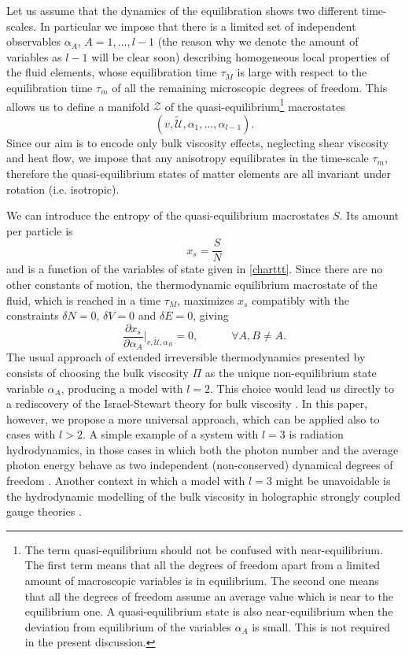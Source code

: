 \documentclass[useAMS,usenatbib,prd,twocolumn,nofootinbib]{revtex4-1}
\newcommand{\spc}{\quad \quad \quad}
\begin{document}
Let us assume  that the dynamics of the equilibration shows two different time-scales. In particular we impose that there is a limited set of independent observables $\alpha_A$, $A=1,...,l-1$ (the reason why we denote the amount of variables as $l-1$ will be clear soon) describing homogeneous local properties of the fluid elements, whose equilibration time $\tau_M$ is large with respect to the equilibration time $\tau_m$ of all the remaining microscopic degrees of freedom. This allows us to define a manifold $\mathcal{Z}$ of the quasi-equilibrium\footnote{
    The term quasi-equilibrium should not be confused with near-equilibrium. The first term means that all the degrees of freedom apart from a limited amount of macroscopic variables is in equilibrium. The second one means that all the degrees of freedom assume an average value which is near to the equilibrium one. A quasi-equilibrium state is also near-equilibrium when the deviation from equilibrium of the variables $\alpha_A$ is small. This is not required in the present discussion.
    } macrostates 
\begin{equation}\label{charttt}
(v, \tilde{\mathcal{U}} ,\alpha_1,...,\alpha_{l-1}).
\end{equation}  
Since our aim is to encode only bulk viscosity effects, neglecting shear viscosity and heat flow, we impose that any anisotropy equilibrates in the time-scale $\tau_m$, therefore the quasi-equilibrium states of matter elements are all invariant under rotation (i.e. isotropic).


We can introduce the entropy of the quasi-equilibrium macrostates $S$. Its amount per particle is 
\begin{equation}
x_s = \dfrac{S}{N}
\end{equation}
and is a function of the variables of state given in \eqref{charttt}. Since there are no other constants of motion, the thermodynamic equilibrium macrostate of the fluid, which is reached in a time $\tau_M$, maximizes $x_s$ compatibly with the constraints $\delta N =0$, $\delta V =0$ and $\delta E =0$, giving
\begin{equation}\label{equilllll}
\dfrac{\partial x_s}{\partial \alpha_A} \bigg|_{v,\tilde{\mathcal{U}}, \alpha_B} =0, \spc \forall A,B\neq A.
\end{equation}
The usual approach of extended irreversible thermodynamics presented by \citet{Jou_Extended} consists of choosing the bulk viscosity $\Pi$ as the unique non-equilibrium state variable $\alpha_A$, producing a model with $l=2$. This choice would lead us directly to a rediscovery of the Israel-Stewart theory for bulk viscosity \citep{Israel_Stewart_1979}. In this paper, however, we propose a more universal approach, which can be applied also to cases with $l>2$. A simple example of a system with $l=3$ is radiation hydrodynamics, in those cases in which both the photon number and the average photon energy behave as two independent (non-conserved) dynamical degrees of freedom \citep{gavassino2020radiation}. Another context in which a model with $l=3$ might be unavoidable is the hydrodynamic modelling of the bulk viscosity in holographic strongly coupled gauge theories \citep{Heller2014}.
\end{document}
